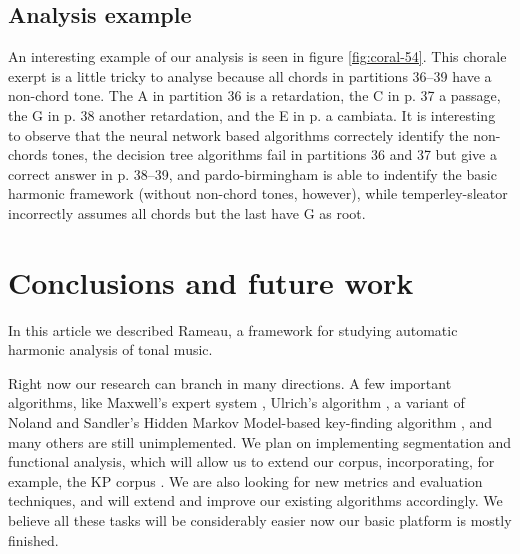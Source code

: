 \documentclass{article}
\begin{document}
\subsection{Analysis example}
\label{sec:analysis-example}

An interesting example of our analysis is seen in figure
\ref{fig:coral-54}. This chorale exerpt is a little tricky to analyse
because all chords in partitions 36--39 have a non-chord tone. The A
in partition 36 is a retardation, the C in p. 37 a passage, the G in
p. 38 another retardation, and the E in p. a cambiata. It is
interesting to observe that the neural network based algorithms
correctely identify the non-chords tones, the decision tree algorithms
fail in partitions 36 and 37 but give a correct answer in p. 38--39,
and pardo-birmingham is able to indentify the basic harmonic framework
(without non-chord tones, however), while temperley-sleator
incorrectly assumes all chords but the last have G as root.

\section{Conclusions and future work}
\label{sec:concl-future-work}

In this article we described Rameau, a framework for studying
automatic harmonic analysis of tonal music.

Right now our research can branch in many directions. A few important
algorithms, like Maxwell's expert system \cite{maxwell:expert},
Ulrich's algorithm \cite{ulrich:analysis}, a variant of Noland and
Sandler's Hidden Markov Model-based key-finding algorithm
\cite{noland.ea:key}, and many others are still unimplemented. We plan
on implementing segmentation and functional analysis, which will allow
us to extend our corpus, incorporating, for example, the KP corpus
\cite{temperley:bayesian}. We are also looking for new metrics and
evaluation techniques, and will extend and improve our existing
algorithms accordingly. We believe all these tasks will be
considerably easier now our basic platform is mostly finished.




\end{document}
